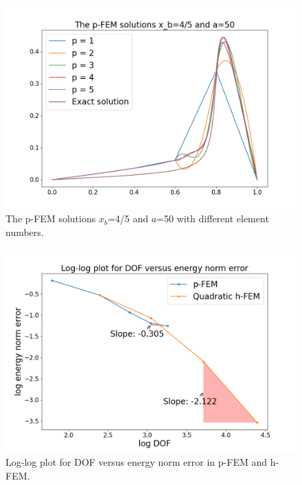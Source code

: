 \documentclass[twoside,twocolumn,10pt]{article}
\begin{document}
\begin{figure}[!ht]
  \centering
  \includegraphics[width=1.\linewidth]{Q1/Q1_5.png}
  \caption{The p-FEM solutions $x_b$=4/5 and $a$=50 with different element numbers.}
  \label{fig:p_5}
\end{figure}

\begin{figure}[!ht]
  \centering
  \includegraphics[width=1.\linewidth]{Q1/h_p_error_5.png}
  \caption{Log-log plot for DOF versus energy norm error in p-FEM and h-FEM.}
  \label{fig:h_p_error_5}
\end{figure}
\end{document}
